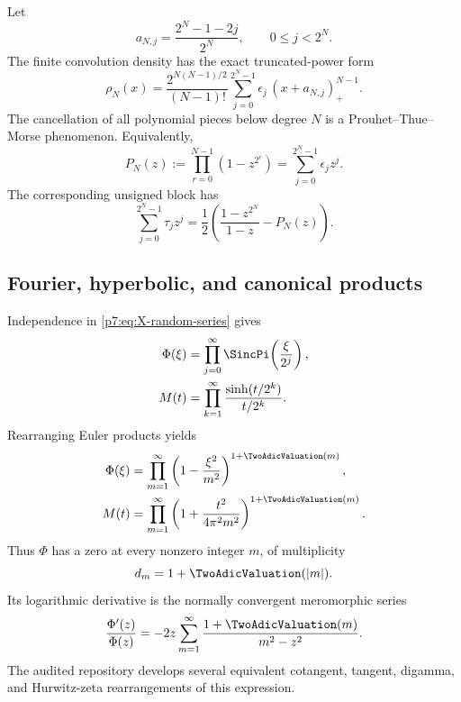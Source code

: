 \documentclass[11pt]{article}
\theoremstyle{definition}
\theoremstyle{remark}
\begin{document}
Let
\[
 a_{N,j}=\frac{2^N-1-2j}{2^N},\qquad 0\le j<2^N.
\]
The finite convolution density has the exact truncated-power form
\begin{equation}
 \rho_N(x)=\frac{2^{N(N-1)/2}}{(N-1)!}
 \sum_{j=0}^{2^N-1}\epsilon_j\,(x+a_{N,j})_+^{N-1}.
 \label{p7:eq:finite-spline}
\end{equation}
The cancellation of all polynomial pieces below degree \(N\) is a Prouhet--Thue--Morse
phenomenon. Equivalently,
\begin{equation}
 P_N(z):=\prod_{r=0}^{N-1}(1-z^{2^r})
 =\sum_{j=0}^{2^N-1}\epsilon_j z^j.
 \label{p7:eq:finite-TM-product}
\end{equation}
The corresponding unsigned block has
\begin{equation}
 \sum_{j=0}^{2^N-1}\tau_j z^j
 =\frac12\left(\frac{1-z^{2^N}}{1-z}-P_N(z)\right).
 \label{p7:eq:unsigned-finite-product}
\end{equation}

\subsection{Fourier, hyperbolic, and canonical products}

Independence in \eqref{p7:eq:X-random-series} gives
\begin{align}
 \Phi(\xi)
 &=\prod_{j=0}^{\infty}\SincPi\!\left(\frac{\xi}{2^j}\right),
 \label{p7:eq:phi-sinc-product}\\
 M(t)
 &=\prod_{k=1}^{\infty}\frac{\sinh(t/2^k)}{t/2^k}.
 \label{p7:eq:M-hyperbolic-product}
\end{align}
Rearranging Euler products yields
\begin{align}
 \Phi(\xi)
 &=\prod_{m=1}^{\infty}
 \left(1-\frac{\xi^2}{m^2}\right)^{1+\TwoAdicValuation(m)},
 \label{p7:eq:phi-canonical-product}\\
 M(t)
 &=\prod_{m=1}^{\infty}
 \left(1+\frac{t^2}{4\pi^2m^2}\right)^{1+\TwoAdicValuation(m)}.
 \label{p7:eq:M-canonical-product}
\end{align}
Thus \(\Phi\) has a zero at every nonzero integer \(m\), of multiplicity
\begin{equation}
 d_m=1+\TwoAdicValuation(|m|).
 \label{p7:eq:zero-multiplicity}
\end{equation}
Its logarithmic derivative is the normally convergent meromorphic series
\begin{equation}
 \frac{\Phi'(z)}{\Phi(z)}
 =-2z\sum_{m=1}^{\infty}\frac{1+\TwoAdicValuation(m)}{m^2-z^2}.
 \label{p7:eq:phi-log-derivative}
\end{equation}
The audited repository develops several equivalent cotangent, tangent, digamma, and
Hurwitz-zeta rearrangements of this expression.
\end{document}
